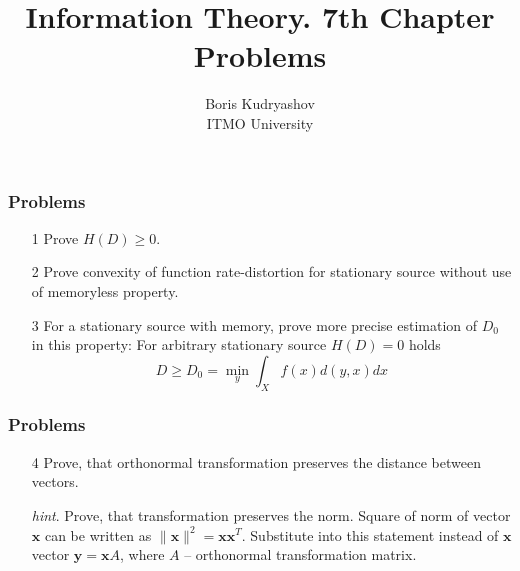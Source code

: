 \documentclass[14pt]{beamer}
\title{\small{Information Theory. 7th Chapter Problems}}
\author{\huge{
Boris Kudryashov \\
\vspace{30pt}
ITMO University
}}
\renewcommand{\vec}[1]{\ensuremath{\boldsymbol{#1}}}
\begin{document}
\maketitle


\begin{frame}
\frametitle{Problems}
\begin{enumerate}

    \item[1] Prove $H(D)\ge 0$.
    
    \pause
    \item[2] Prove convexity of function rate-distortion for stationary source without use of memoryless property.
    
    \pause
    \item[3] \label{max_dist}
    For a stationary source with memory, prove more precise estimation of $D_0$ in this property:
    \small{
    For arbitrary stationary source $H(D)= 0$ holds
    \begin{equation} \label{maxD}
    D \ge D_0 =\min_y\int_X f(x) d(y,x) dx
    \end{equation}
    }

\end{enumerate}
\end{frame}

\begin{frame}
\frametitle{Problems}
\begin{enumerate}

    
    \item[4] \label{orthogonal_tr} Prove, that orthonormal transformation preserves the distance between vectors.
    
    \pause
    \emph{hint}. Prove, that transformation preserves the norm. Square of norm of vector $\vec x$ can be written as $\|\vec x\|^2=\vec x \vec x^T$. Substitute into this statement instead of $\vec x$ vector $\vec y=\vec x A$, where $A$ -- orthonormal transformation matrix.


\end{enumerate}
\end{frame}
\end{document}
